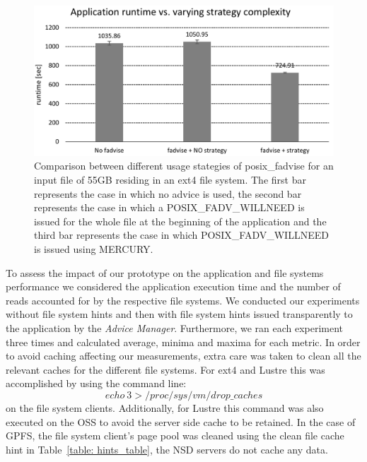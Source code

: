 \begin{figure}[!htb]
  \centering
  \includegraphics[width=\columnwidth]{figures/SC2015/ROOT/separate_plots/test_cluster/test_fadvise_no_border}
  \caption{Comparison between different usage stategies of posix\_fadvise for an input file of 55GB residing in an ext4 file system. The first bar represents the case in which no advice is used, the second bar represents the case in which a POSIX\_FADV\_WILLNEED is issued for the whole file at the beginning of the application and the third bar represents the case in which POSIX\_FADV\_WILLNEED is issued using MERCURY.}
  \label{figure: fadvise_comparison}
\end{figure} 
 
To assess the impact of our prototype on the application and file systems performance we considered the application execution time and the number of reads accounted for by the respective file systems. We conducted our experiments without file system hints and then with file system hints issued transparently to the application by the \textit{Advice Manager}. Furthermore, we ran each experiment three times and calculated average, minima and maxima for each metric. In order to avoid caching affecting our measurements, extra care was taken to clean all the relevant caches for the different file systems. For ext4 and Lustre this was accomplished by using the command line: $$echo\ 3 > /proc/sys/vm/drop\_caches$$ on the file system clients. Additionally, for Lustre this command was also executed on the OSS to avoid the server side cache to be retained. In the case of GPFS, the file system client's page pool was cleaned using the clean file cache hint in Table~\ref{table: hints_table}, the NSD servers do not cache any data. 

